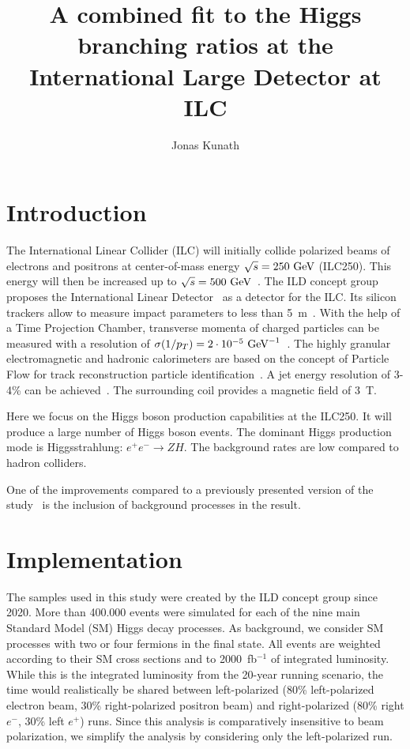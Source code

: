 \documentclass[a4paper,11pt]{article}
\title{A combined fit to the Higgs branching ratios at the International Large Detector at ILC}
\author*[a,\dag]{Jonas Kunath}
\affiliation[a]{Laboratoire Leprince-Ringuet, IN2P3-CNRS, École Polytechnique, Institut Polytechnique de Paris\\
Route de Saclay, 91120 Palaiseau, France}
\newcommand{\eV}{\text{e\kern-0.15ex V}\xspace}
\newcommand{\GeV}{\text{G\eV}\xspace}
\begin{document}
\maketitle

\section{Introduction}
The International Linear Collider (ILC) will initially collide polarized beams
of electrons and positrons at center-of-mass energy $\sqrt{s}=250~\GeV$ (ILC250).
This energy will then be increased up to $\sqrt{s}=500~\GeV$~\cite{ILC_Staging_2017}.
The ILD concept group proposes the International Linear Detector~\cite{ILD_DBD,ILD_IDR}
as a detector for the ILC.
Its silicon trackers allow to measure impact parameters to less than 5~{\textmu}m~\cite{ILD_IDR}.
With the help of a Time Projection Chamber, transverse momenta of charged particles
can be measured with a resolution of $\sigma(1/p_T) = 2 \cdot 10^{-5}~\GeV^{-1}$~\cite{ILD_IDR}.
The highly granular electromagnetic and hadronic calorimeters
are based on the concept of Particle Flow
for track reconstruction particle identification~\cite{ParticleFlow}.
A jet energy resolution of 3-4\% can be achieved~\cite{ILD_IDR}.
The surrounding coil provides a magnetic field of 3~T.

Here we focus on the Higgs boson production capabilities at the ILC250.
It will produce a large number of Higgs boson events.
The dominant Higgs production mode is Higgsstrahlung: $e^+e^- \to ZH$.
The background rates are low compared to hadron colliders.

One of the improvements compared to
a previously presented version of the study~\cite{LCWS_combined_Higgs}
is the inclusion of background processes in the result.

\section{Implementation}\label{sec:Implementation}
The samples used in this study were created by the ILD concept group since 2020.
More than 400.000 events were simulated for each of the nine main Standard Model (SM)
Higgs decay processes.
As background, we consider SM processes
with two or four fermions in the final state.
All events are weighted according to their SM cross sections
and to 2000~fb$^{-1}$ of integrated luminosity.
While this is the integrated luminosity from the 20-year running scenario,
the time would realistically be shared
between left-polarized
(80\% left-polarized electron beam, 30\% right-polarized positron beam)
and right-polarized (80\% right $e^-$, 30\% left $e^+$) runs.
Since this analysis is comparatively insensitive to beam polarization,
we simplify the analysis by considering only the left-polarized run.
\end{document}
